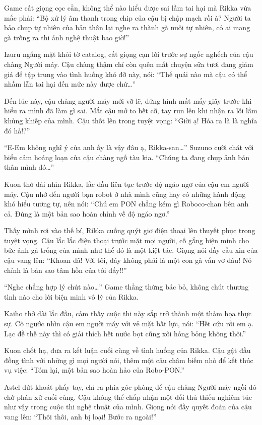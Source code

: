 \documentclass[../main.tex]{subfiles}
\begin{document}
Game cất giọng cọc cằn, không thể nào hiểu được sai lầm tai hại mà Rikka vừa mắc phải: ``Bộ xử lý âm thanh trong chip của cậu bị chập mạch rồi à? Người ta bảo chụp tự nhiên của bản thân lại nghe ra thành gà nuôi tự nhiên, có ai mang gà trống ra thi ảnh nghệ thuật bao giờ!''

Izuru ngẩng mặt khỏi tờ catalog, cất giọng cạn lời trước sự ngốc nghếch của cậu chàng Người máy. Cậu chàng thậm chí còn quên mất chuyện sữa tươi đang giảm giá để tập trung vào tình huống khó đỡ này, nói: ``Thế quái nào mà cậu có thể nhầm lẫn tai hại đến mức này được chứ\dots''

Đến lúc này, cậu chàng người máy mới vỡ lẽ, đứng hình mất mấy giây trước khi hiểu ra mình đã làm gì sai. Mắt cậu mở to hết cỡ, tay run lên khi nhận ra lỗi lầm khủng khiếp của mình. Cậu thốt lên trong tuyệt vọng: ``Giời ạ! Hóa ra là là nghĩa đó hả!?''

``E-Em không nghĩ ý của anh ấy là vậy đâu ạ, Rikka-san\dots'' Suzuno cười chát với biểu cảm hoảng loạn của cậu chàng ngố tàu kia. ``Chúng ta đang chụp ảnh bản thân mình đó\dots''

Kuon thở dài nhìn Rikka, lắc đầu liên tục trước độ ngáo ngơ của cậu em người máy. Cậu nhớ đến người bạn robot ở nhà mình cũng hay có những hành động khó hiểu tương tự, nên nói: ``Chú em PON chẳng kém gì Roboco-chan bên anh cả. Đúng là một bản sao hoàn chỉnh về độ ngáo ngơ.''

Thấy mình rơi vào thế bí, Rikka cuống quýt giơ điện thoại lên thuyết phục trong tuyệt vọng. Cậu lắc lắc điện thoại trước mặt mọi người, cố gắng biện minh cho bức ảnh gà trống của mình như thể đó là một kiệt tác. Giọng nói đầy cầu xin của cậu vang lên: ``Khoan đã! Với tôi, đây không phải là một con gà vẩn vơ đâu! Nó chính là bản sao tâm hồn của tôi đấy!!''

``Nghe chẳng hợp lý chút nào\dots'' Game thẳng thừng bác bỏ, không chút thương tình nào cho lời biện minh vô lý của Rikka.

Kaiho thở dài lắc đầu, cảm thấy cuộc thi này sắp trở thành một thảm họa thực sự. Cô ngước nhìn cậu em người máy với vẻ mặt bất lực, nói: ``Hết cứu rồi em ạ. Lạc đề thế này thì có giải thích hết nước bọt cũng xôi hỏng bỏng không thôi.''

Kuon chốt hạ, đưa ra kết luận cuối cùng về tình huống của Rikka. Cậu gật đầu đồng tình với những gì mọi người nói, thêm một câu châm biếm nhỏ để kết thúc vụ việc: ``Tóm lại, một bản sao hoàn hảo của Robo-PON.''

Astel dứt khoát phẩy tay, chỉ ra phía góc phòng để cậu chàng Người máy ngồi đó chờ phán xử cuối cùng. Cậu không thể chấp nhận một đối thủ thiếu nghiêm túc như vậy trong cuộc thi nghệ thuật của mình. Giọng nói đầy quyết đoán của cậu vang lên: ``Thôi thôi, anh bị loại! Bước ra ngoài!''
\end{document}
